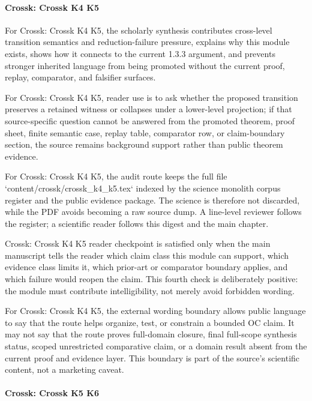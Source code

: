 \paragraph{Crossk: Crossk K4 K5}

For Crossk: Crossk K4 K5, the scholarly synthesis contributes cross-level transition semantics and reduction-failure pressure, explains why this module exists, shows how it connects to the current 1.3.3 argument, and prevents stronger inherited language from being promoted without the current proof, replay, comparator, and falsifier surfaces.


For Crossk: Crossk K4 K5, reader use is to ask whether the proposed transition preserves a retained witness or collapses under a lower-level projection; if that source-specific question cannot be answered from the promoted theorem, proof sheet, finite semantic case, replay table, comparator row, or claim-boundary section, the source remains background support rather than public theorem evidence.


For Crossk: Crossk K4 K5, the audit route keeps the full file `content/crossk/crossk\_k4\_k5.tex` indexed by the science monolith corpus register and the public evidence package. The science is therefore not discarded, while the PDF avoids becoming a raw source dump. A line-level reviewer follows the register; a scientific reader follows this digest and the main chapter.


Crossk: Crossk K4 K5 reader checkpoint is satisfied only when the main manuscript tells the reader which claim class this module can support, which evidence class limits it, which prior-art or comparator boundary applies, and which failure would reopen the claim. This fourth check is deliberately positive: the module must contribute intelligibility, not merely avoid forbidden wording.


For Crossk: Crossk K4 K5, the external wording boundary allows public language to say that the route helps organize, test, or constrain a bounded OC claim. It may not say that the route proves full-domain closure, final full-scope synthesis status, scoped unrestricted comparative claim, or a domain result absent from the current proof and evidence layer. This boundary is part of the source's scientific content, not a marketing caveat.


\paragraph{Crossk: Crossk K5 K6}

